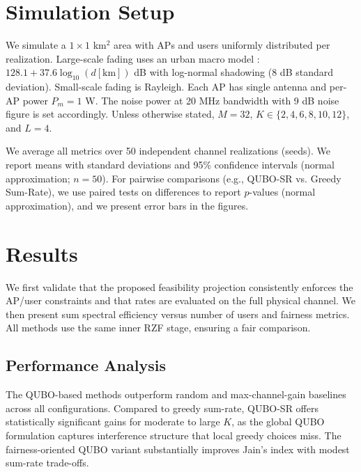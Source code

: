 \section{Simulation Setup}
We simulate a $1\times 1$ km$^2$ area with APs and users uniformly distributed per realization. Large-scale fading uses an urban macro model \cite{bjornson2016massive}: $128.1+37.6\log_{10}(d[\mathrm{km}])$ dB with log-normal shadowing (8 dB standard deviation). Small-scale fading is Rayleigh. Each AP has single antenna and per-AP power $P_m=1$ W. The noise power at 20 MHz bandwidth with 9 dB noise figure is set accordingly. Unless otherwise stated, $M=32$, $K\in\{2,4,6,8,10,12\}$, and $L=4$.

We average all metrics over 50 independent channel realizations (seeds). We report means with standard deviations and 95\% confidence intervals (normal approximation; $n=50$). For pairwise comparisons (e.g., QUBO-SR vs. Greedy Sum-Rate), we use paired tests on differences to report $p$-values (normal approximation), and we present error bars in the figures.

\section{Results}
We first validate that the proposed feasibility projection consistently enforces the AP/user constraints and that rates are evaluated on the full physical channel. We then present sum spectral efficiency versus number of users and fairness metrics. All methods use the same inner RZF stage, ensuring a fair comparison.

\subsection{Performance Analysis}
The QUBO-based methods outperform random and max-channel-gain baselines across all configurations. Compared to greedy sum-rate, QUBO-SR offers statistically significant gains for moderate to large $K$, as the global QUBO formulation captures interference structure that local greedy choices miss. The fairness-oriented QUBO variant substantially improves Jain's index with modest sum-rate trade-offs.

